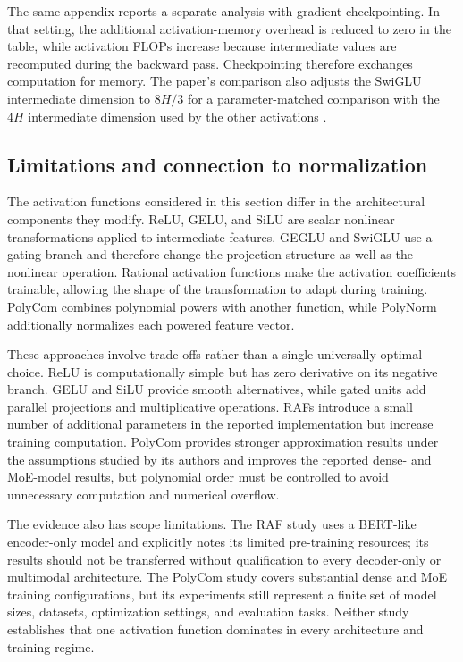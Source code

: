 The same appendix reports a separate analysis with gradient
checkpointing. In that setting, the additional activation-memory
overhead is reduced to zero in the table, while activation FLOPs
increase because intermediate values are recomputed during the
backward pass. Checkpointing therefore exchanges computation for
memory. The paper's comparison also adjusts the SwiGLU intermediate
dimension to \(8H/3\) for a parameter-matched comparison with
the \(4H\) intermediate dimension used by the other activations
\parencite{zhuo2025polycom}.

\subsection{Limitations and connection to normalization}
\label{subsec:act-limitations}

The activation functions considered in this section differ in the
architectural components they modify. ReLU, GELU, and SiLU are
scalar nonlinear transformations applied to intermediate features.
GEGLU and SwiGLU use a gating branch and therefore change the
projection structure as well as the nonlinear operation. Rational
activation functions make the activation coefficients trainable,
allowing the shape of the transformation to adapt during training.
PolyCom combines polynomial powers with another function, while
PolyNorm additionally normalizes each powered feature vector.

These approaches involve trade-offs rather than a single universally
optimal choice. ReLU is computationally simple but has zero
derivative on its negative branch. GELU and SiLU provide smooth
alternatives, while gated units add parallel projections and
multiplicative operations. RAFs introduce a small number of
additional parameters in the reported implementation but increase
training computation. PolyCom provides stronger approximation
results under the assumptions studied by its authors and improves
the reported dense- and MoE-model results, but polynomial order
must be controlled to avoid unnecessary computation and numerical
overflow.

The evidence also has scope limitations. The RAF study uses a
BERT-like encoder-only model and explicitly notes its limited
pre-training resources; its results should not be transferred
without qualification to every decoder-only or multimodal
architecture. The PolyCom study covers substantial dense and
MoE training configurations, but its experiments still represent
a finite set of model sizes, datasets, optimization settings,
and evaluation tasks. Neither study establishes that one
activation function dominates in every architecture and
training regime.

